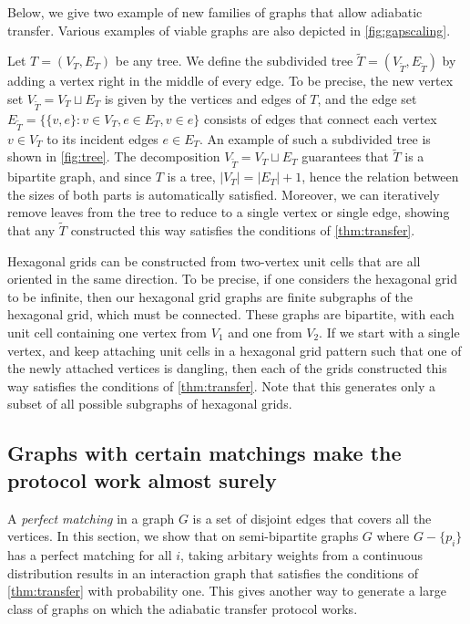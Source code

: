 Below, we give two example of new families of graphs that allow adiabatic transfer. Various examples of viable graphs are also depicted in \cref{fig:gapscaling}.
%
\begin{example}
\label{ex:trees}
%
Let $T = (V_T,E_T)$ be any tree. We define the subdivided tree $\widetilde{T} = (V_{\widetilde{T}},E_{\widetilde{T}})$ by adding a vertex right in the middle of every edge. To be precise, the new vertex set $V_{\widetilde{T}} = V_T \sqcup E_T$ is given by the vertices and edges of $T$, and the edge set $E_{\widetilde{T}} = \{\{v,e\}:v\in V_T,e\in E_T,v\in e\}$ consists of edges that connect each vertex $v \in V_T$ to its incident edges $e \in E_T$. An example of such a subdivided tree is shown in \cref{fig:tree}. The decomposition $V_{\widetilde{T}} = V_T \sqcup E_T $ guarantees that $\widetilde{T}$ is a bipartite graph, and since $T$ is a tree,  $ |V_T| = |E_T| + 1 $, hence the relation between the sizes of both parts is automatically satisfied. Moreover, we can iteratively remove leaves from the tree to reduce to a single vertex or single edge, showing that any $\widetilde{T}$ constructed this way satisfies the conditions of \cref{thm:transfer}.
\end{example}


%
\begin{example}
Hexagonal grids can be constructed from two-vertex unit cells that are all oriented in the same direction. To be precise, if one considers the hexagonal grid to be infinite, then our hexagonal grid graphs are finite subgraphs of the hexagonal grid, which must be connected. These graphs are bipartite, with each unit cell containing one vertex from $V_1$ and one from $V_2$. If we start with a single vertex, and keep attaching unit cells in a hexagonal grid pattern such that one of the newly attached vertices is dangling, then each of the grids constructed this way satisfies the conditions of \cref{thm:transfer}. Note that this generates only a subset of all possible subgraphs of hexagonal grids.
\end{example}




\subsection{Graphs with certain matchings make the protocol work almost surely}
\label{sec:perfmatching}

A \emph{perfect matching} in a graph $G$ is a set of disjoint edges that covers all the vertices.
In this section, we show that on semi-bipartite graphs $G$ where $G-\{ p_i\}$ has a perfect matching for all $i$, taking arbitary weights from a continuous distribution results in an interaction graph that satisfies the conditions of \cref{thm:transfer} with probability one. This gives another way to generate a large class of graphs on which the adiabatic transfer protocol works.\par


